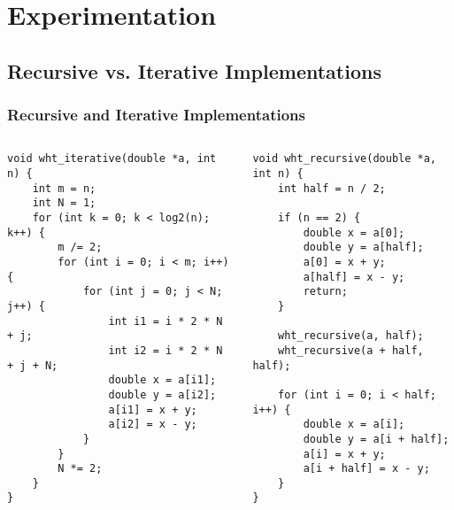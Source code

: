 \documentclass[mathserif,usenames,dvipsnames]{beamer}
\begin{document}
\section{Experimentation}
\subsection{Recursive vs. Iterative Implementations}
\begin{frame}[fragile] %

    \frametitle{Recursive and Iterative Implementations}
\begin{columns}[l]
{\tiny
\begin{verbatim}
void wht_iterative(double *a, int n) {
    int m = n;
    int N = 1;
    for (int k = 0; k < log2(n); k++) {
        m /= 2;
        for (int i = 0; i < m; i++) {
            for (int j = 0; j < N; j++) {
                int i1 = i * 2 * N + j;
                int i2 = i * 2 * N + j + N;
                double x = a[i1];
                double y = a[i2];
                a[i1] = x + y;
                a[i2] = x - y;
            }
        }
        N *= 2;
    }
}



\end{verbatim}
}
{\tiny
\begin{verbatim}
void wht_recursive(double *a, int n) {
    int half = n / 2;

    if (n == 2) {
        double x = a[0];
        double y = a[half];
        a[0] = x + y;
        a[half] = x - y;
        return;
    }

    wht_recursive(a, half);
    wht_recursive(a + half, half);

    for (int i = 0; i < half; i++) {
        double x = a[i];
        double y = a[i + half];
        a[i] = x + y;
        a[i + half] = x - y;
    }
}
\end{verbatim}
}
\end{columns}
\end{frame}
\end{document}
